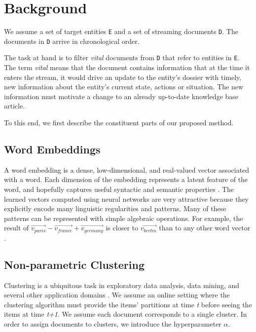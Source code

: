 \documentclass{article}
\begin{document}
\section{Background}
\label{background} 

We assume a set of target entities {\tt E} and a set of streaming documents {\tt D}. The documents in {\tt D} arrive in chronological order.

The task at hand is to filter {\it vital} documents from {\tt D} that refer to entities in {\tt E}.
The term {\it vital} means that the document contains information that at the time it enters the stream, it would drive an update to the entity's dossier with timely, new information about the entity's current state, actions or situation. The new information must motivate a change to an already up-to-date knowledge base article.

To this end, we first describe the constituent parts of our proposed method.

\subsection{Word Embeddings}

A word embedding is a dense, low-dimensional, and real-valued vector associated with a word. Each dimension of the embedding represents a latent feature of the word, and hopefully captures useful syntactic and semantic properties \cite{Turian10wordrepresentations}.
The learned vectors computed using neural networks are very attractive because they explicitly encode many linguistic regularities and patterns. Many of these patterns can be represented with simple algebraic operations. For example, the result of $\vec{v_{paris}} - \vec{v_{france}} + \vec{v_{germany}}$ is closer to $\vec{v_{berlin}}$ than to any other word vector \cite{mikolovChen,mikolovYih}.

\subsection{Non-parametric Clustering}

Clustering is a ubiquitous task in exploratory data analysis, data mining, and several other application domains \cite{KrishnamurthyBXS12}.
We assume an online setting where the clustering algorithm must provide the items' partitions at time {\it t} before seeing the items at time {\it t+1}.
We assume each document corresponds to a single cluster. In order to assign documents to clusters, we introduce the hyperparameter $\alpha$.
\end{document}
